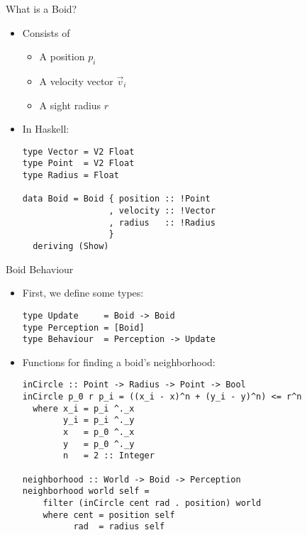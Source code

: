 \documentclass{beamer}
\begin{document}
\begin{frame}[fragile]
    \huge{What is a Boid?}\normalsize
    \begin{itemize}
        \item Consists of
        \begin{itemize}
            \item A position $p_i$
            \item A velocity vector $\vec{v}_i$
            \item A sight radius $r$
        \end{itemize}
        \item<2-> In Haskell:
        \begin{verbatim}
type Vector = V2 Float
type Point  = V2 Float
type Radius = Float

data Boid = Boid { position :: !Point
                 , velocity :: !Vector
                 , radius   :: !Radius
                 }
  deriving (Show)
        \end{verbatim}
    \end{itemize}
\end{frame}

\begin{frame}[fragile]
    \huge{Boid Behaviour}\normalsize
    \begin{itemize}
        \item First, we define some types:
        \begin{verbatim}
type Update     = Boid -> Boid
type Perception = [Boid]
type Behaviour  = Perception -> Update
        \end{verbatim}
        \item<2-> Functions for finding a boid's neighborhood:
        \begin{verbatim}
inCircle :: Point -> Radius -> Point -> Bool
inCircle p_0 r p_i = ((x_i - x)^n + (y_i - y)^n) <= r^n
  where x_i = p_i ^._x
        y_i = p_i ^._y
        x   = p_0 ^._x
        y   = p_0 ^._y
        n   = 2 :: Integer

neighborhood :: World -> Boid -> Perception
neighborhood world self =
    filter (inCircle cent rad . position) world
    where cent = position self
          rad  = radius self
    \end{verbatim}
    \end{itemize}
\end{frame}
\end{document}
